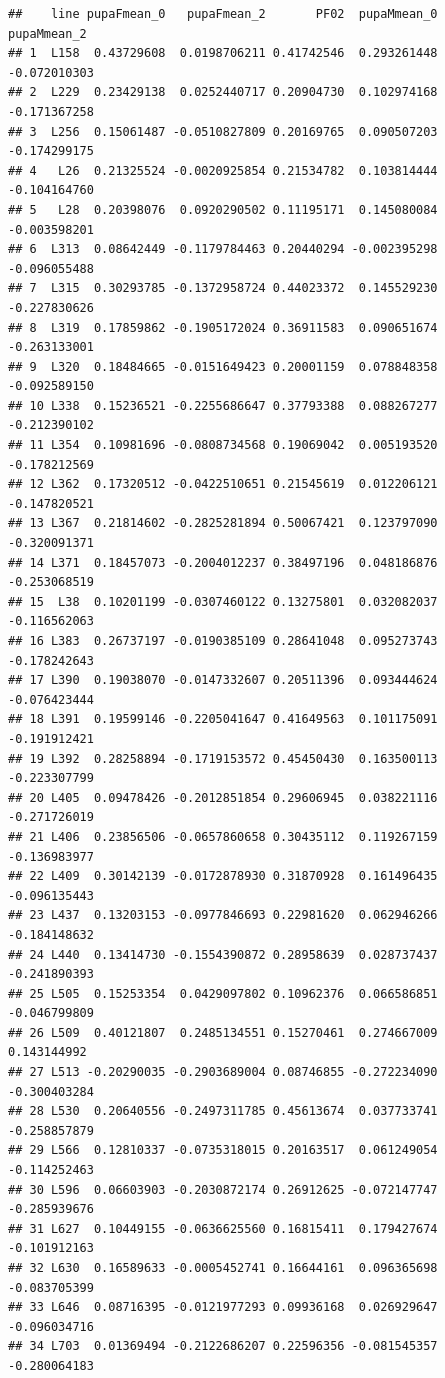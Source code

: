 \documentclass[
]{article}
\begin{document}
\begin{verbatim}
##    line pupaFmean_0   pupaFmean_2       PF02  pupaMmean_0  pupaMmean_2
## 1  L158  0.43729608  0.0198706211 0.41742546  0.293261448 -0.072010303
## 2  L229  0.23429138  0.0252440717 0.20904730  0.102974168 -0.171367258
## 3  L256  0.15061487 -0.0510827809 0.20169765  0.090507203 -0.174299175
## 4   L26  0.21325524 -0.0020925854 0.21534782  0.103814444 -0.104164760
## 5   L28  0.20398076  0.0920290502 0.11195171  0.145080084 -0.003598201
## 6  L313  0.08642449 -0.1179784463 0.20440294 -0.002395298 -0.096055488
## 7  L315  0.30293785 -0.1372958724 0.44023372  0.145529230 -0.227830626
## 8  L319  0.17859862 -0.1905172024 0.36911583  0.090651674 -0.263133001
## 9  L320  0.18484665 -0.0151649423 0.20001159  0.078848358 -0.092589150
## 10 L338  0.15236521 -0.2255686647 0.37793388  0.088267277 -0.212390102
## 11 L354  0.10981696 -0.0808734568 0.19069042  0.005193520 -0.178212569
## 12 L362  0.17320512 -0.0422510651 0.21545619  0.012206121 -0.147820521
## 13 L367  0.21814602 -0.2825281894 0.50067421  0.123797090 -0.320091371
## 14 L371  0.18457073 -0.2004012237 0.38497196  0.048186876 -0.253068519
## 15  L38  0.10201199 -0.0307460122 0.13275801  0.032082037 -0.116562063
## 16 L383  0.26737197 -0.0190385109 0.28641048  0.095273743 -0.178242643
## 17 L390  0.19038070 -0.0147332607 0.20511396  0.093444624 -0.076423444
## 18 L391  0.19599146 -0.2205041647 0.41649563  0.101175091 -0.191912421
## 19 L392  0.28258894 -0.1719153572 0.45450430  0.163500113 -0.223307799
## 20 L405  0.09478426 -0.2012851854 0.29606945  0.038221116 -0.271726019
## 21 L406  0.23856506 -0.0657860658 0.30435112  0.119267159 -0.136983977
## 22 L409  0.30142139 -0.0172878930 0.31870928  0.161496435 -0.096135443
## 23 L437  0.13203153 -0.0977846693 0.22981620  0.062946266 -0.184148632
## 24 L440  0.13414730 -0.1554390872 0.28958639  0.028737437 -0.241890393
## 25 L505  0.15253354  0.0429097802 0.10962376  0.066586851 -0.046799809
## 26 L509  0.40121807  0.2485134551 0.15270461  0.274667009  0.143144992
## 27 L513 -0.20290035 -0.2903689004 0.08746855 -0.272234090 -0.300403284
## 28 L530  0.20640556 -0.2497311785 0.45613674  0.037733741 -0.258857879
## 29 L566  0.12810337 -0.0735318015 0.20163517  0.061249054 -0.114252463
## 30 L596  0.06603903 -0.2030872174 0.26912625 -0.072147747 -0.285939676
## 31 L627  0.10449155 -0.0636625560 0.16815411  0.179427674 -0.101912163
## 32 L630  0.16589633 -0.0005452741 0.16644161  0.096365698 -0.083705399
## 33 L646  0.08716395 -0.0121977293 0.09936168  0.026929647 -0.096034716
## 34 L703  0.01369494 -0.2122686207 0.22596356 -0.081545357 -0.280064183

\end{verbatim}
\end{document}
